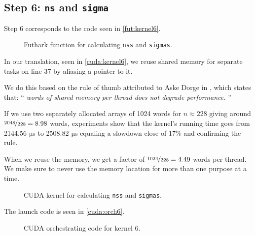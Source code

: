 \subsection{
    Step 6: \texttt{ns} and \texttt{sigma}
}

Step 6 corresponds to the code seen in \autoref{fut:kernel6}.

\begin{figure}[H]
    \centering
    \caption{Futhark function for calculating \texttt{nss} and \texttt{sigmas}.}
    \label{fut:kernel6}
\end{figure}

In our translation, seen in \autoref{cuda:kernel6},
we reuse shared memory for separate tasks on line 37 by aliasing a pointer to
it. 

We do this based on the rule of thumb attributed to Aske Dorge in \cite[p.
29]{pmphL5}, which states that:
\enquote{
    \textit{
         words of shared memory per thread does not degrade performance.
}}

If we use two separately allocated arrays of 1024 words for \(n\approx228\)
giving around \(\nicefrac{2048}{228} = 8.98\) words, experiments show that
the kernel's running time goes from 2144.56 µs to
2508.82 µs equaling a slowdown close of 17\% and confirming the rule.

When we reuse the memory, we get a factor of \(\nicefrac{1024}{228} = 4.49\)
words per thread. We make sure to never use the memory location for more than
one purpose at a time.

\begin{figure}[H]
    \centering
    \caption{CUDA kernel for calculating \texttt{nss} and \texttt{sigmas}.}
    \label{cuda:kernel6}
\end{figure}

The launch code is seen in \autoref{cuda:orch6}.

\begin{figure}[H]
    \centering
    \caption{CUDA orchestrating code for kernel 6.}
    \label{cuda:orch6}
\end{figure}

